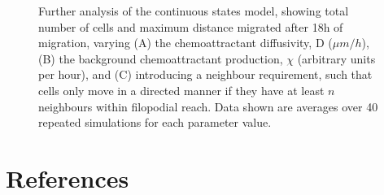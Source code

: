 \documentclass[review]{elsarticle}
\begin{document}
\begin{figure}
\caption{Further analysis of the continuous states model, showing total number of cells and maximum distance migrated after 18h of migration, varying (A) the chemoattractant diffusivity, D ($\mu m/h$), (B) the background chemoattractant production, $\chi$ (arbitrary units per hour), and (C)  introducing a neighbour requirement, such that cells only move in a directed manner if they have at least $n$ neighbours within filopodial reach. Data shown are averages over 40 repeated simulations for each parameter value.\label{figNaiveModelSweeps}}
\end{figure}

\clearpage
\section*{References}

\end{document}

